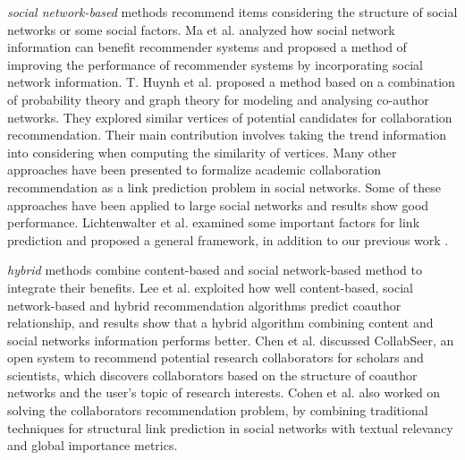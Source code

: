 \documentclass[review]{elsarticle}
\begin{document}
\emph{social network-based} methods recommend items considering the structure of social networks or some social factors. Ma et al. \cite{ma2011recommender} analyzed how social network information can benefit recommender systems and proposed a method of improving the performance of recommender systems by incorporating social network information. T. Huynh et al. \cite{huynh2013trend} proposed a method based on a combination of probability theory and graph theory for modeling and analysing co-author networks. They explored similar vertices of potential candidates for collaboration recommendation. Their main contribution involves taking the trend information into considering when computing the similarity of vertices. Many other approaches have been presented to formalize academic collaboration recommendation as a link prediction problem \cite{chen2012discovering} \cite{sun2011co} in social networks. Some of these approaches have been applied to large social networks and results show good performance. Lichtenwalter et al. \cite{lichtenwalter2010new} examined some important factors for link prediction and proposed a general framework, in addition to our previous work \cite{li2014acrec}.

\emph{hybrid} methods combine content-based and social network-based method to integrate their benefits. Lee et al. \cite{lee2011recommending} exploited how well content-based, social network-based and hybrid recommendation algorithms predict coauthor relationship, and results show that a hybrid algorithm combining content and social networks information performs better. Chen et al. \cite{chen2011collabseer} discussed CollabSeer, an open system to recommend potential research collaborators for scholars and scientists, which discovers collaborators based on the structure of coauthor networks and the user's topic of research interests. Cohen et al. \cite{cohen2013recommending} also worked on solving the collaborators recommendation problem, by combining traditional techniques for structural link prediction in social networks with textual relevancy and global importance metrics.

\end{document}
